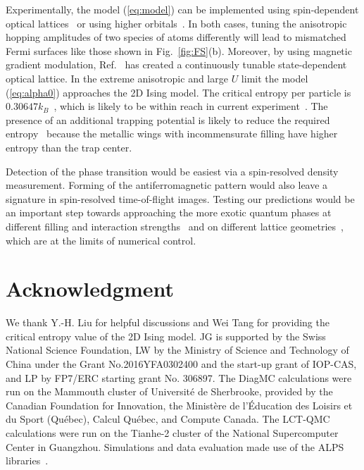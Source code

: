 \documentclass[twocolumn,superscriptaddress,pra,showpacs,longbibliography]{revtex4-1}
\newcommand{\<}{\langle}
\renewcommand{\>}{\rangle}
\begin{document}
Experimentally, the model (\ref{eq:model}) can be implemented using spin-dependent optical lattices~\cite{PhysRevLett.91.010407} or using higher orbitals~\cite{PhysRevLett.99.200405, Wirth:2010bh}. In both cases, tuning the  anisotropic hopping amplitudes of two species of atoms differently will lead to mismatched Fermi surfaces like those shown in Fig.~\ref{fig:FS}(b). Moreover, by using magnetic gradient modulation, Ref.~\cite{PhysRevLett.115.073002} has created a continuously tunable state-dependent optical lattice. 
In the extreme anisotropic and large $U$ limit the model (\ref{eq:alpha0}) approaches the 2D Ising model. The critical entropy per particle is $0.30647k_{B}$~\cite{PhysRev.65.117}, which is likely to be within reach in current experiment~\cite{Mazurenko2016}. The presence of an additional trapping potential is likely to reduce the required entropy~\cite{PhysRevLett.104.180401} because the metallic wings with incommensurate filling have higher entropy than the trap center. 

Detection of the phase transition would be easiest via a spin-resolved density measurement. Forming of the antiferromagnetic pattern would also leave a signature in spin-resolved time-of-flight images. Testing our predictions would be an important step towards approaching the more exotic quantum phases at different filling and interaction strengths~\cite{Gukelberger:2014dba} and on different lattice geometries~\cite{Wu:2008ea, Zhao:2008ev}, which are at the limits of numerical control.  

\section{Acknowledgment}
We thank Y.-H. Liu for helpful discussions and Wei Tang for providing the critical entropy value of the 2D Ising model. JG is supported by the Swiss National Science Foundation, LW  by the Ministry of Science and Technology of China under the Grant No.2016YFA0302400 and the start-up grant of IOP-CAS, and LP  by FP7/ERC starting grant No. 306897. The DiagMC calculations were run on the Mammouth cluster of Universit\'e de Sherbrooke, provided by the Canadian Foundation for Innovation, the Minist\`ere de l'\'Education des Loisirs et du Sport (Qu\'ebec), Calcul Qu\'ebec, and Compute Canada. The LCT-QMC calculations were run on the Tianhe-2 cluster of the National Supercomputer Center in Guangzhou. Simulations and data evaluation made use of the ALPS libraries~\cite{alps20,alps13}.

%
{}
\end{document}
